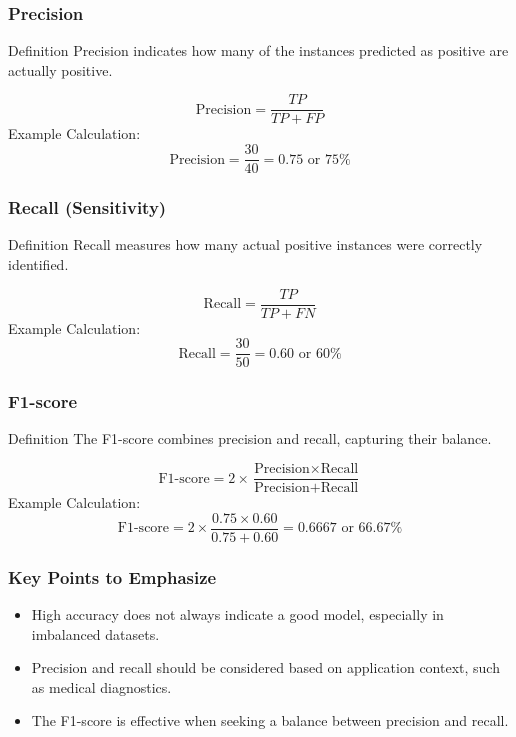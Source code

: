 \documentclass[aspectratio=169]{beamer}
\begin{document}
\begin{frame}[fragile]
    \frametitle{Precision}
    \begin{block}{Definition}
        Precision indicates how many of the instances predicted as positive are actually positive.
    \end{block}
    \begin{equation}
        \text{Precision} = \frac{TP}{TP + FP}
    \end{equation}
    Example Calculation:
    \begin{equation}
        \text{Precision} = \frac{30}{40} = 0.75 \text{ or } 75\%
    \end{equation}
\end{frame}

\begin{frame}[fragile]
    \frametitle{Recall (Sensitivity)}
    \begin{block}{Definition}
        Recall measures how many actual positive instances were correctly identified.
    \end{block}
    \begin{equation}
        \text{Recall} = \frac{TP}{TP + FN}
    \end{equation}
    Example Calculation:
    \begin{equation}
        \text{Recall} = \frac{30}{50} = 0.60 \text{ or } 60\%
    \end{equation}
\end{frame}

\begin{frame}[fragile]
    \frametitle{F1-score}
    \begin{block}{Definition}
        The F1-score combines precision and recall, capturing their balance.
    \end{block}
    \begin{equation}
        \text{F1-score} = 2 \times \frac{\text{Precision} \times \text{Recall}}{\text{Precision} + \text{Recall}}
    \end{equation}
    Example Calculation:
    \begin{equation}
        \text{F1-score} = 2 \times \frac{0.75 \times 0.60}{0.75 + 0.60} = 0.6667 \text{ or } 66.67\%
    \end{equation}
\end{frame}

\begin{frame}[fragile]
    \frametitle{Key Points to Emphasize}
    \begin{itemize}
        \item High accuracy does not always indicate a good model, especially in imbalanced datasets.
        \item Precision and recall should be considered based on application context, such as medical diagnostics.
        \item The F1-score is effective when seeking a balance between precision and recall.
    \end{itemize}
\end{frame}
\end{document}
